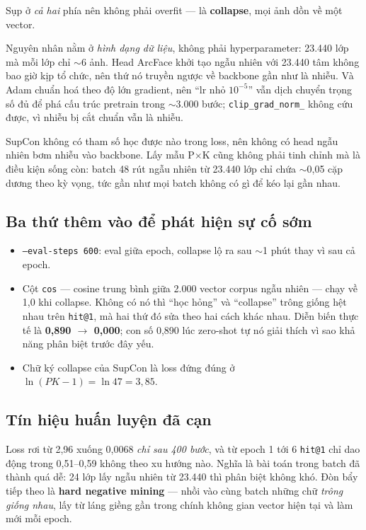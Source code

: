 \documentclass[11pt,a4paper]{article}
\newcommand{\code}[1]{\texttt{#1}}
\begin{document}
Sụp ở \emph{cả hai} phía nên không phải overfit --- là \textbf{collapse}, mọi ảnh dồn về một vector.

Nguyên nhân nằm ở \emph{hình dạng dữ liệu}, không phải hyperparameter: 23.440 lớp mà mỗi lớp chỉ
$\sim$6 ảnh. Head ArcFace khởi tạo ngẫu nhiên với 23.440 tâm không bao giờ kịp tổ chức, nên thứ nó
truyền ngược về backbone gần như là nhiễu. Và Adam chuẩn hoá theo độ lớn gradient, nên ``lr nhỏ
$10^{-5}$'' vẫn dịch chuyển trọng số đủ để phá cấu trúc pretrain trong $\sim$3.000 bước;
\code{clip\_grad\_norm\_} không cứu được, vì nhiễu bị cắt chuẩn vẫn là nhiễu.

SupCon không có tham số học được nào trong loss, nên không có head ngẫu nhiên bơm nhiễu vào backbone.
Lấy mẫu P$\times$K cũng không phải tinh chỉnh mà là điều kiện sống còn: batch 48 rút ngẫu nhiên từ
23.440 lớp chỉ chứa $\sim$0,05 cặp dương theo kỳ vọng, tức gần như mọi batch không có gì để kéo lại
gần nhau.

\subsection{Ba thứ thêm vào để phát hiện sự cố sớm}

\begin{itemize}
  \item \code{--eval-steps 600}: eval giữa epoch, collapse lộ ra sau $\sim$1 phút thay vì sau cả
        epoch.
  \item Cột \code{cos} --- cosine trung bình giữa 2.000 vector corpus ngẫu nhiên --- chạy về 1,0 khi
        collapse. Không có nó thì ``học hỏng'' và ``collapse'' trông giống hệt nhau trên
        \code{hit@1}, mà hai thứ đó sửa theo hai cách khác nhau. Diễn biến thực tế là
        \textbf{0,890 $\to$ 0,000}; con số 0,890 lúc zero-shot tự nó giải thích vì sao khả năng phân
        biệt trước đây yếu.
  \item Chữ ký collapse của SupCon là loss đứng đúng ở $\ln(PK-1) = \ln 47 = 3{,}85$.
\end{itemize}

\subsection{Tín hiệu huấn luyện đã cạn}

Loss rơi từ 2,96 xuống 0,0068 \emph{chỉ sau 400 bước}, và từ epoch 1 tới 6 \code{hit@1} chỉ dao động
trong 0,51--0,59 không theo xu hướng nào. Nghĩa là bài toán trong batch đã thành quá dễ: 24 lớp lấy
ngẫu nhiên từ 23.440 thì phân biệt không khó. Đòn bẩy tiếp theo là \textbf{hard negative mining} ---
nhồi vào cùng batch những chữ \emph{trông giống nhau}, lấy từ láng giềng gần trong chính không gian
vector hiện tại và làm mới mỗi epoch.
\end{document}
